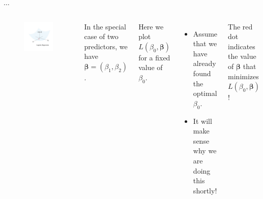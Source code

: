 \documentclass[8pt]{beamer}
\newcommand{\mys}{\vspace{0.5cm} %
}
\begin{document}
\begin{frame}{\color{white} $\ldots$}

\begin{columns}

\begin{figure}
    \centering
    \includegraphics[trim = 0 0 0 0, clip, width = \textwidth]{min_nll.pdf}
\end{figure}


In the special case of two predictors, we have $\bm{\beta} = (\beta_1, \beta_2)$. \mys

Here we plot $L(\beta_0, \bm{\beta})$ for a fixed value of $\beta_0$.
\begin{itemize}
    \item Assume that we have already found the optimal $\beta_0$.
    \item It will make sense why we are doing this shortly!
\end{itemize} \mys

The red dot indicates the value of $\bm{\beta}$ that minimizes $L(\beta_0, \bm{\beta})$!
    
\end{columns}
    
\end{frame}
\end{document}
